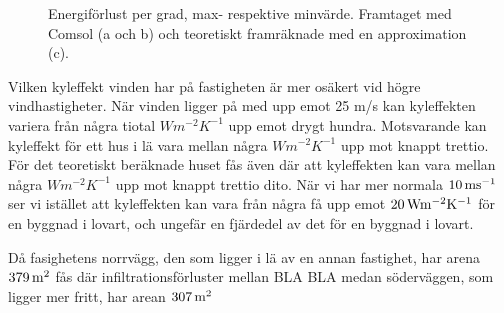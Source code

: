\begin{figure}[hpbt]
\centering
{}
\vspace{5mm}


\caption{\label{fig:windenergyloss}Energiförlust per grad, max- respektive minvärde.
Framtaget med Comsol (a och b) och teoretiskt framräknade med en approximation (c).}
\end{figure}

Vilken kyleffekt vinden har på fastigheten är mer osäkert vid högre vindhastigheter. När vinden
 ligger på med upp emot 25 m/s kan kyleffekten variera från några tiotal $\unit{W m^{-2} K^{-1}}$ upp 
 emot drygt hundra. Motsvarande kan kyleffekt för ett hus i lä vara mellan några $\unit{W m^{-2} K^{-1}}$ upp mot knappt trettio. För det teoretiskt beräknade huset fås även där att kyleffekten 
 kan vara mellan några $\unit{W m^{-2} K^{-1}}$ upp mot knappt trettio dito. När vi har mer normala $\unit[10]{m s^{-1}}$ ser vi istället att kyleffekten kan vara från några få upp emot $\unit[20]{W m^{-2} K^{-1}}$ för en byggnad i 
 lovart, och ungefär en fjärdedel av det för en byggnad i lovart.
 
Då fasighetens norrvägg, den som ligger i lä av en annan fastighet, har arena $\unit[379]{m^2}$ fås där infiltrationsförluster mellan BLA BLA medan söderväggen, som ligger mer fritt, har arean $\unit[307]{m^2}$ 

